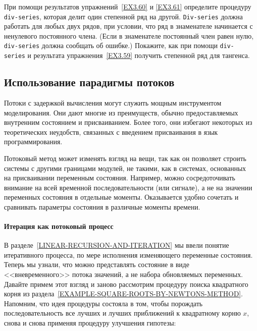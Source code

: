 \begin{exercise}{3.62}\label{EX3.62}%
 При помощи результатов
упражнений~\ref{EX3.60} и \ref{EX3.61} определите
процедуру  {\tt div-series},
которая делит один степенной ряд на другой. {\tt Div-series}
должна работать для любых двух рядов, при
условии, что ряд в знаменателе начинается с ненулевого постоянного
члена. (Если в знаменателе постоянный член равен нулю,
{\tt div-series} должна сообщать об ошибке.)  Покажите, как при
помощи {\tt div-series} и результата
упражнения~\ref{EX3.59} получить
степенной ряд для тангенса.
\end{exercise}

\subsection{Использование парадигмы потоков}
\label{EXPLOITING-THE-STREAM-PARADIGM}


Потоки с задержкой вычисления могут служить мощным
инструментом моделирования.  Они дают многие из преимуществ, обычно
предоставляемых внутренним состоянием и присваиванием.  Более того,
они избегают некоторых из теоретических неудобств, связанных с
введением присваивания в язык программирования.

Потоковый метод может изменять взгляд на
вещи, так как он позволяет строить системы с другими границами модулей,
не такими, как в системах, основанных на присваивании переменным состояния.
Например, можно сосредоточивать внимание на всей временной
последовательности (или сигнале), а не на значении переменных состояния в
отдельные моменты.  Оказывается удобно сочетать и сравнивать параметры
состояния в различные моменты времени.

\paragraph{Итерация как потоковый процесс}


В разделе~\ref{LINEAR-RECURSION-AND-ITERATION} мы ввели понятие
итеративного процесса, по мере исполнения изменяющего переменные
состояния.  Теперь мы узнали, что можно представлять состояние в виде
<<вневременного>> потока значений, а не набора обновляемых
переменных.  Давайте примем этот взгляд и заново рассмотрим
процедуру поиска квадратного корня из
раздела~\ref{EXAMPLE-SQUARE-ROOTS-BY-NEWTONS-METHOD}.  Напомним,
что идея процедуры состояла в том, чтобы порождать последовательность все
лучших и лучших приближений к квадратному корню $x$, снова
и снова применяя процедуру улучшения гипотезы:

